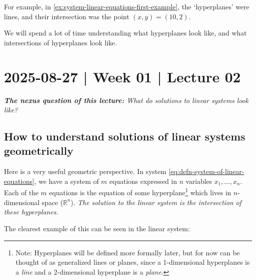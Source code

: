 \documentclass[10pt]{article}
\theoremstyle{definition}
\newcommand{\R}{\mathbb{R}}           %
\begin{document}
For example, in \cref{ex:system-linear-equations-first-example}, the
`hyperplanes' were lines, and their intersection was the point $(x,y)=(10,2)$.


We will spend a lot of time understanding what hyperplanes look like, and what
intersections of hyperplanes look like.



\newpage
\section{2025-08-27 | Week 01 | Lecture 02}

\begin{center}
  \begin{tcolorbox}[width=0.9\textwidth, colback=white, colframe=black]
    \textit{\textbf{The nexus question of this lecture:} What do solutions to
      linear systems look like?}
  \end{tcolorbox}
\end{center}
\subsection{How to understand solutions of linear systems geometrically}
Here is a very useful geometric perspective. In
system \eqref{eq:defn-system-of-linear-equations}, we have a system of $m$ equations
expressed in $n$ variables $x_{1},\ldots,x_{n}$. Each of the $m$ equations is
the equation of some hyperplane\footnote{Note: Hyperplanes will be defined
  more formally later, but for now can be thought of as generalized lines or
  planes, since a 1-dimensional hyperplanes is a \textit{line} and a
  2-dimensional hyperplane is a \textit{plane}.} which lives in
$n$-dimensional space ($\R^{n}$). \textit{The solution to the linear system is the
intersection of these hyperplanes.}

The clearest example of this can be seen in the linear system:
\end{document}
